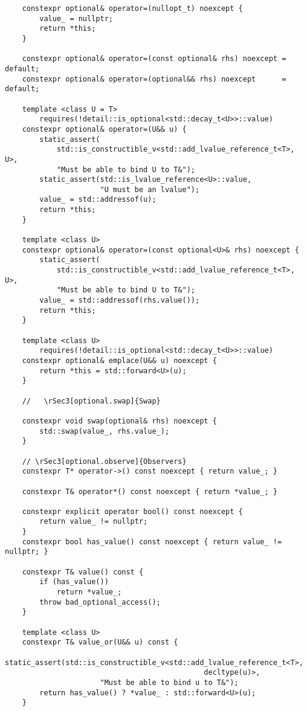 \documentclass[a4paper,10pt,oneside,openany,final,article]{memoir}
\begin{document}
\begin{verbatim}
    constexpr optional& operator=(nullopt_t) noexcept {
        value_ = nullptr;
        return *this;
    }

    constexpr optional& operator=(const optional& rhs) noexcept = default;
    constexpr optional& operator=(optional&& rhs) noexcept      = default;

    template <class U = T>
        requires(!detail::is_optional<std::decay_t<U>>::value)
    constexpr optional& operator=(U&& u) {
        static_assert(
            std::is_constructible_v<std::add_lvalue_reference_t<T>, U>,
            "Must be able to bind U to T&");
        static_assert(std::is_lvalue_reference<U>::value,
                      "U must be an lvalue");
        value_ = std::addressof(u);
        return *this;
    }

    template <class U>
    constexpr optional& operator=(const optional<U>& rhs) noexcept {
        static_assert(
            std::is_constructible_v<std::add_lvalue_reference_t<T>, U>,
            "Must be able to bind U to T&");
        value_ = std::addressof(rhs.value());
        return *this;
    }

    template <class U>
        requires(!detail::is_optional<std::decay_t<U>>::value)
    constexpr optional& emplace(U&& u) noexcept {
        return *this = std::forward<U>(u);
    }

    //   \rSec3[optional.swap]{Swap}

    constexpr void swap(optional& rhs) noexcept {
        std::swap(value_, rhs.value_);
    }

    // \rSec3[optional.observe]{Observers}
    constexpr T* operator->() const noexcept { return value_; }

    constexpr T& operator*() const noexcept { return *value_; }

    constexpr explicit operator bool() const noexcept {
        return value_ != nullptr;
    }
    constexpr bool has_value() const noexcept { return value_ != nullptr; }

    constexpr T& value() const {
        if (has_value())
            return *value_;
        throw bad_optional_access();
    }

    template <class U>
    constexpr T& value_or(U&& u) const {
        static_assert(std::is_constructible_v<std::add_lvalue_reference_t<T>,
                                              decltype(u)>,
                      "Must be able to bind u to T&");
        return has_value() ? *value_ : std::forward<U>(u);
    }


\end{verbatim}
\end{document}
